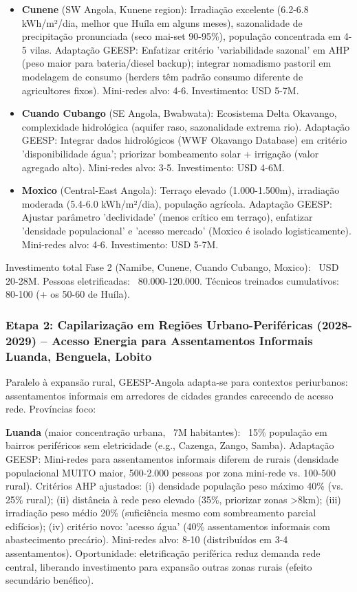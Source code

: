 \documentclass[12pt, a4paper]{article}
\begin{document}
{{{{{{{{{{{{\begin{itemize}
\item \textbf{Cunene} (SW Angola, Kunene region): Irradiação excelente (6.2-6.8 kWh/m²/dia, melhor que Huíla em alguns meses), sazonalidade de precipitação pronunciada (seco mai-set 90-95\%), população concentrada em 4-5 vilas. Adaptação GEESP: Enfatizar critério 'variabilidade sazonal' em AHP (peso maior para bateria/diesel backup); integrar nomadismo pastoril em modelagem de consumo (herders têm padrão consumo diferente de agricultores fixos). Mini-redes alvo: 4-6. Investimento: USD 5-7M.

\item \textbf{Cuando Cubango} (SE Angola, Bwabwata): Ecosistema Delta Okavango, complexidade hidrológica (aquifer raso, sazonalidade extrema rio). Adaptação GEESP: Integrar dados hidrológicos (WWF Okavango Database) em critério 'disponibilidade água'; priorizar bombeamento solar + irrigação (valor agregado alto). Mini-redes alvo: 3-5. Investimento: USD 4-6M.

\item \textbf{Moxico} (Central-East Angola): Terraço elevado (1.000-1.500m), irradiação moderada (5.4-6.0 kWh/m²/dia), população agrícola. Adaptação GEESP: Ajustar parâmetro 'declividade' (menos crítico em terraço), enfatizar 'densidade populacional' e 'acesso mercado' (Moxico é isolado logisticamente). Mini-redes alvo: 4-6. Investimento: USD 5-7M.
\end{itemize}

Investimento total Fase 2 (Namibe, Cunene, Cuando Cubango, Moxico): ~USD 20-28M. Pessoas eletrificadas: ~80.000-120.000. Técnicos treinados cumulativos: 80-100 (+ os 50-60 de Huíla).

\subsubsection{Etapa 2: Capilarização em Regiões Urbano-Periféricas (2028-2029) -- Acesso Energia para Assentamentos Informais Luanda, Benguela, Lobito}

Paralelo à expansão rural, GEESP-Angola adapta-se para contextos periurbanos: assentamentos informais em arredores de cidades grandes carecendo de acesso rede. Províncias foco:

\textbf{Luanda} (maior concentração urbana, ~7M habitantes): ~15\% população em bairros periféricos sem eletricidade (e.g., Cazenga, Zango, Samba). Adaptação GEESP: Mini-redes para assentamentos informais diferem de rurais (densidade populacional MUITO maior, 500-2.000 pessoas por zona mini-rede vs. 100-500 rural). Critérios AHP ajustados: (i) densidade população peso máximo 40\% (vs. 25\% rural); (ii) distância à rede peso elevado (35\%, priorizar zonas >8km); (iii) irradiação peso médio 20\% (suficiência mesmo com sombreamento parcial edifícios); (iv) critério novo: 'acesso água' (40\% assentamentos informais com abastecimento precário). Mini-redes alvo: 8-10 (distribuídos em 3-4 assentamentos). Oportunidade: eletrificação periférica reduz demanda rede central, liberando investimento para expansão outras zonas rurais (efeito secundário benéfico).

}}}}}}}}}}}}
\end{document}
